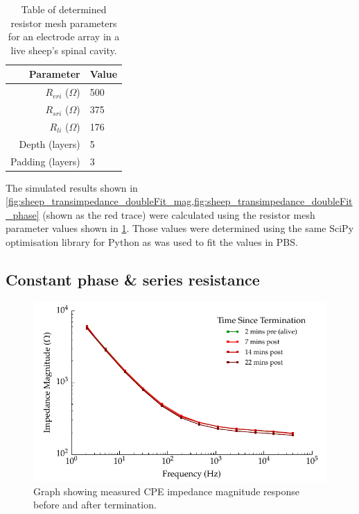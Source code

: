     \begin{table}
      \centering
      \begin{tabular}{r | l}
        Parameter & Value \\
        \hline
        $R_{eri}$ ($\Omega$)& 500\\
        $R_{sri}$ ($\Omega$)& 375\\
        $R_{li}$ ($\Omega$)& 176\\
        Depth (layers) & 5 \\
        Padding (layers) & 3 \\
      \end{tabular}
      \caption{\label{tab:RESparams_sheep} Table of determined resistor mesh parameters for an electrode array in a live sheep's spinal cavity.}
    \end{table}
    The simulated results shown in \cref{fig:sheep_transimpedance_doubleFit_mag,fig:sheep_transimpedance_doubleFit_phase} (shown as the red trace) were calculated using the resistor mesh parameter values shown in \cref{tab:RESparams_sheep}.
    Those values were determined using the same SciPy optimisation library for Python as was used to fit the values in PBS.
  
  
  \subsection{Constant phase \& series resistance}

    \begin{figure}
      \centering
      \includegraphics{content/pt2/08-InterfaceParameters/graphics/graph_Day2_Sheep_CPE_ImpedanceMagnitude}
      \caption{\label{fig:graph_Day2_Sheep_CPE_ImpedanceMagnitude} Graph showing measured CPE impedance magnitude response before and after termination.} 
    \end{figure}
    
